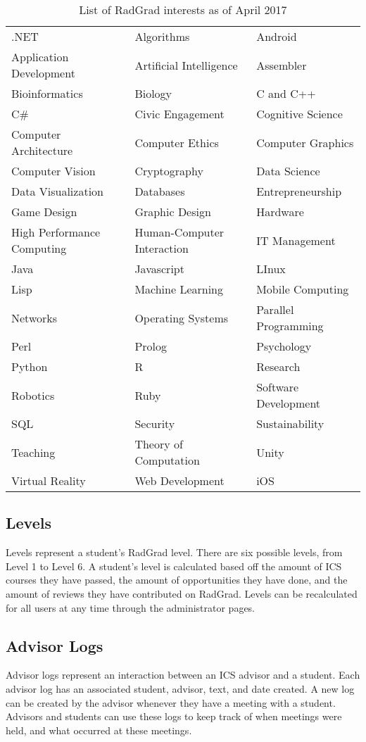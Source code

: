 \begin{table}[h!]
\centering
\begin{tabular}{ l l l } 
.NET & Algorithms & Android \\ 
Application Development & Artificial Intelligence & Assembler \\
Bioinformatics & Biology & C and C++ \\
C\# & Civic Engagement & Cognitive Science \\
Computer Architecture & Computer Ethics & Computer Graphics \\
Computer Vision & Cryptography & Data Science \\
Data Visualization & Databases & Entrepreneurship \\
Game Design & Graphic Design & Hardware \\
High Performance Computing & Human-Computer Interaction & IT Management \\
Java & Javascript & LInux \\
Lisp & Machine Learning & Mobile Computing \\
Networks & Operating Systems & Parallel Programming \\
Perl & Prolog & Psychology \\
Python & R & Research \\
Robotics & Ruby & Software Development \\
SQL & Security & Sustainability \\
Teaching & Theory of Computation & Unity \\
Virtual Reality & Web Development & iOS
\end{tabular}
\caption{List of RadGrad interests as of April 2017}
\label{table:2}
\end{table}

\subsection{Levels}
Levels represent a student's RadGrad level. There are six possible levels, from Level 1 to Level 6. A student's level is calculated based off the amount of ICS courses they have passed, the amount of opportunities they have done, and the amount of reviews they have contributed on RadGrad. Levels can be recalculated for all users at any time through the administrator pages.

\subsection{Advisor Logs}
Advisor logs represent an interaction between an ICS advisor and a student. Each advisor log has an associated student, advisor, text, and date created. A new log can be created by the advisor whenever they have a meeting with a student. Advisors and students can use these logs to keep track of when meetings were held, and what occurred at these meetings. 

